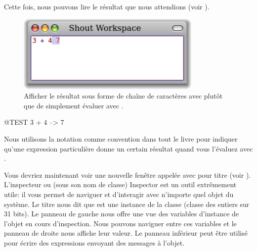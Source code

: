 \documentclass[a4paper,10pt,twoside]{book}
\begin{document}
Cette fois, nous pouvons lire le résultat que nous attendions (voir
).

\begin{figure}[htb]
\centerline {\includegraphics[width=0.8\textwidth]{PrintIt}}
\caption{Afficher le résultat sous forme de chaîne de
  caractères avec  plutôt que de simplement
  évaluer avec .}
\end{figure}

\begin{code}{@TEST}
3 + 4 --> 7
\end{code}
\noindent
Nous utilisons la notation \ct{-->} comme convention dans tout le
livre pour indiquer qu'une expression particulière donne un certain
résultat quand vous l'évaluez avec .


\noindent
Vous devriez maintenant voir une nouvelle fenêtre appelée
 avec pour titre 
  (voir ).
L'inspecteur ou (sous son nom de classe) Inspector est un outil
extrêmement utile: il vous permet de naviguer et d'interagir avec
n'importe quel objet du système.
Le titre nous dit que  est une instance de la classe
(classe des entiers sur 31 bits).
Le panneau de gauche nous offre une vue des variables d'instance de
l'objet en cours d'inspection. Nous pouvons naviguer entre ces
variables et le panneau de droite nous affiche leur valeur.
Le panneau inférieur peut être utilisé pour écrire des
expressions envoyant des messages à l'objet.
\end{document}
